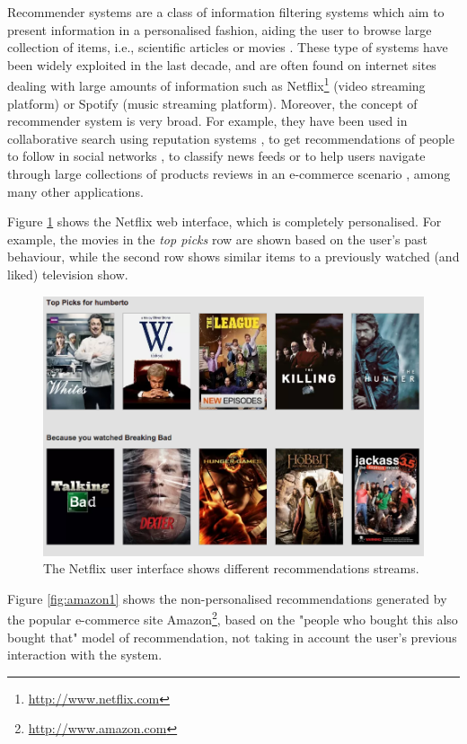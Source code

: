 Recommender systems are a class of information filtering systems which aim to present information in a personalised fashion, aiding the user to browse large collection of items, i.e., scientific articles \cite{Toscher2009} or movies  \cite{Wang2011, Golbeck2006} . These type of  systems have been widely exploited in the last decade, and are often found on internet sites dealing with large amounts of information such as Netflix\footnote{\url{http://www.netflix.com}} (video streaming platform) or Spotify (music streaming platform). Moreover, the concept of recommender system is very broad. For example, they have been used in collaborative search using reputation systems \cite{Mahony2010},  to get recommendations of people to follow in social networks \cite{Hannon2010}, to classify news feeds \cite{Phelan2012, Esparza2013} or to help users navigate through large collections of products reviews in an e-commerce scenario \cite{Dong2012}, among many other applications.


Figure \ref{fig:netflix1} shows the Netflix web interface,  which is completely personalised. For example, the movies in the \emph{top picks} row are shown based on the user's past behaviour, while the second row shows similar items to a previously watched (and liked) television show.


\begin{figure}[h!] 
  \centering
    \includegraphics[width=1\textwidth]{figures/netflix.png}
  \caption{The Netflix user interface shows different recommendations streams.}
   \label{fig:netflix1}
\end{figure}

Figure \ref{fig:amazon1} shows the non-personalised recommendations generated by the popular e-commerce site Amazon\footnote{ \url{http://www.amazon.com}}, based on the "people who bought this also bought that" model of recommendation, not taking in account the user's previous interaction with the system.


